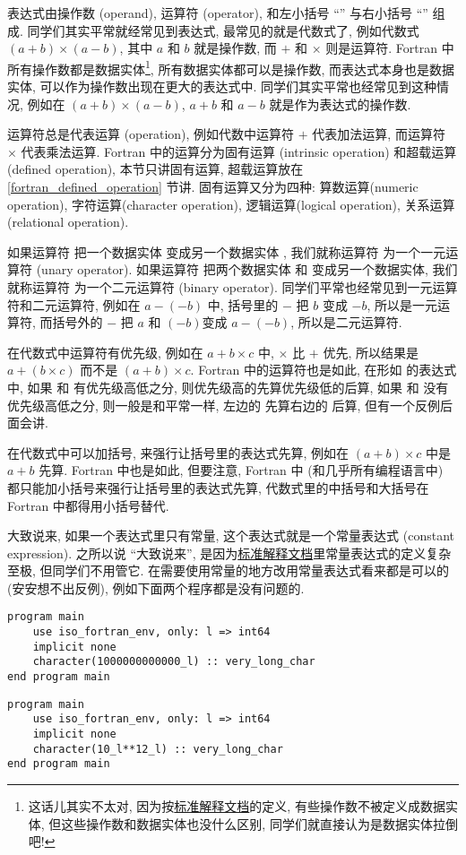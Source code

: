 表达式由操作数 (operand), 运算符 (operator), 和左小括号 ``\ttt{(}'' 与右小括号 ``\ttt{)}'' 组成. 同学们其实平常就经常见到表达式, 最常见的就是代数式了, 例如代数式 $(a+b)\times(a-b)$, 其中 $a$ 和 $b$ 就是操作数, 而 $+$ 和 $\times$ 则是运算符.  Fortran 中所有操作数都是数据实体\footnote{这话儿其实不太对, 因为按\href{https://j3-fortran.org/doc/year/24/24-007.pdf}{标准解释文档}的定义, 有些操作数不被定义成数据实体, 但这些操作数和数据实体也没什么区别, 同学们就直接认为是数据实体拉倒吧!}, 所有数据实体都可以是操作数, 而表达式本身也是数据实体, 可以作为操作数出现在更大的表达式中. 同学们其实平常也经常见到这种情况, 例如在 $(a+b)\times(a-b)$, $a+b$ 和 $a-b$ 就是作为表达式的操作数.

运算符总是代表运算 (operation), 例如代数中运算符 $+$ 代表加法运算, 而运算符 $\times$ 代表乘法运算. Fortran 中的运算分为固有运算 (intrinsic operation) 和超载运算 (defined operation), 本节只讲固有运算, 超载运算放在 \ref{fortran_defined_operation} 节讲. 固有运算又分为四种: 算数运算(numeric operation), 字符运算(character operation), 逻辑运算(logical operation), 关系运算(relational operation).

如果运算符 \ttt{[op]} 把一个数据实体 \ttt{[q]} 变成另一个数据实体 \ttt{[op][q]}, 我们就称运算符 \ttt{[op]} 为一个一元运算符 (unary operator). 如果运算符 \ttt{[op]} 把两个数据实体 \ttt{[q1]} 和 \ttt{[q2]} 变成另一个数据实体\ttt{[q1][op][q2]}, 我们就称运算符 \ttt{[op]} 为一个二元运算符 (binary operator). 同学们平常也经常见到一元运算符和二元运算符, 例如在 $a-(-b)$ 中, 括号里的 $-$ 把 $b$ 变成 $-b$, 所以是一元运算符, 而括号外的 $-$ 把 $a$ 和 $(-b)$变成 $a-(-b)$, 所以是二元运算符.

在代数式中运算符有优先级, 例如在 $a+b\times c$ 中, $\times$ 比 $+$ 优先, 所以结果是 $a+(b\times c)$ 而不是 $(a+b)\times c$. Fortran 中的运算符也是如此, 在形如 \ttt{[q1][op12][q2][op23][q3]} 的表达式中, 如果 \ttt{[op12]} 和 \ttt{[op23]} 有优先级高低之分, 则优先级高的先算优先级低的后算, 如果 \ttt{[op12]} 和 \ttt{[op23]} 没有优先级高低之分, 则一般是和平常一样, 左边的 \ttt{[op12]} 先算右边的 \ttt{[op23]} 后算, 但有一个反例后面会讲.

在代数式中可以加括号, 来强行让括号里的表达式先算, 例如在 $(a+b)\times c$ 中是 $a+b$ 先算. Fortran 中也是如此, 但要注意, Fortran 中 (和几乎所有编程语言中) 都只能加小括号来强行让括号里的表达式先算, 代数式里的中括号和大括号在 Fortran 中都得用小括号替代.

大致说来, 如果一个表达式里只有常量, 这个表达式就是一个常量表达式 (constant expression). 之所以说 ``大致说来'', 是因为\href{https://j3-fortran.org/doc/year/24/24-007.pdf}{标准解释文档}里常量表达式的定义复杂至极, 但同学们不用管它. 在需要使用常量的地方改用常量表达式看来都是可以的 (安安想不出反例), 例如下面两个程序都是没有问题的.
\begin{lstlisting}
program main
    use iso_fortran_env, only: l => int64
    implicit none
    character(1000000000000_l) :: very_long_char
end program main
\end{lstlisting}
\begin{lstlisting}
program main
    use iso_fortran_env, only: l => int64
    implicit none
    character(10_l**12_l) :: very_long_char
end program main
\end{lstlisting}

